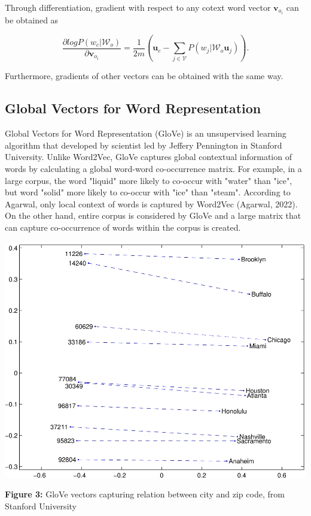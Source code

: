 \documentclass[man]{apa7}
\begin{document}
Through differentiation, gradient with respect to any cotext word vector $\mathbf{v}_{o_i}$ can be obtained as

\begin{equation}
\frac{\partial log P(w_c| \mathcal{W}_o )}{\partial \mathbf{v}_{o_i}} = \frac{1}{2m}(\mathbf{u}_c - \sum_{j \in \mathcal{V}} P(w_j| \mathcal{W}_o \mathbf{u}_j)).
\end{equation}

Furthermore, gradients of other vectors can be obtained with the same way.

\subsection{Global Vectors for Word Representation}
Global Vectors for Word Representation (GloVe) is an unsupervised learning algorithm that developed by scientist led by Jeffery Pennington in Stanford University. Unlike Word2Vec, GloVe captures global contextual information of words by calculating a global word-word co-occurrence matrix. For example, in a large corpus, the word "liquid" more likely to co-occur with "water" than "ice", but word "solid" more likely to co-occur with "ice" than "steam". According to Agarwal, only local context of words is captured by Word2Vec (Agarwal, 2022). On the other hand, entire corpus is considered by GloVe and a large matrix that can capture co-occurrence of words within the corpus is created.
\\[2\baselineskip]

\begin{center}
\includegraphics[scale=3]{city_zip.jpg}

\textbf{Figure 3:} GloVe vectors capturing relation between city and zip code, from Stanford University\\[2\baselineskip]

\end{center}
\end{document}
